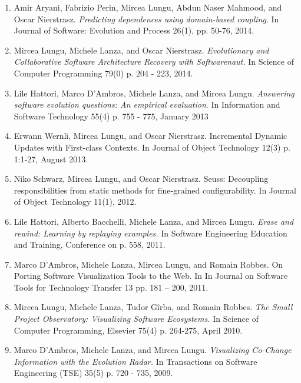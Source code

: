 

\begin{enumerate}
\item Amir Aryani, Fabrizio Perin, Mircea Lungu, Abdun Naser Mahmood, and Oscar Nierstrasz. \emph{Predicting dependences using domain-based coupling}. In Journal of Software: Evolution and Process 26(1), pp. 50-76, 2014. 

\item Mircea Lungu, Michele Lanza, and Oscar Nierstrasz. \emph{Evolutionary and Collaborative Software Architecture Recovery with Softwarenaut.}  In Science of Computer Programming 79(0) p. 204 - 223, 2014.

\item Lile Hattori, Marco D'Ambros, Michele Lanza, and Mircea Lungu. \emph{Answering software evolution questions: An empirical evaluation}. In Information and Software Technology 55(4) p. 755 - 775, January 2013

\item Erwann Wernli, Mircea Lungu, and Oscar Nierstrasz. Incremental Dynamic Updates with First-class Contexts. In Journal of Object Technology 12(3) p. 1:1-27, August 2013.

\item Niko Schwarz, Mircea Lungu, and Oscar Nierstrasz. Seuss: Decoupling responsibilities from static methods for fine-grained configurability. In Journal of Object Technology 11(1), 2012.

\item Lile Hattori, Alberto Bacchelli, Michele Lanza, and Mircea Lungu. \emph{Erase and rewind: Learning by replaying examples.} In Software Engineering Education and Training, Conference on p. 558, 2011.

\item Marco D'Ambros, Michele Lanza, Mircea Lungu, and Romain Robbes. On Porting Software Visualization Tools to the Web. In In Journal on Software Tools for Technology Transfer 13 pp. 181 -- 200, 2011.

\item Mircea Lungu, Michele Lanza, Tudor G\^irba, and Romain Robbes. \emph{The Small Project Observatory: Visualizing Software Ecosystems.} In Science of Computer Programming, Elsevier 75(4) p. 264-275, April 2010.

\item Marco D'Ambros, Michele Lanza, and Mircea Lungu. \emph{Visualizing Co-Change Information with the Evolution Radar.} In Transactions on Software Engineering (TSE) 35(5) p. 720 - 735, 2009.
\end{enumerate}




